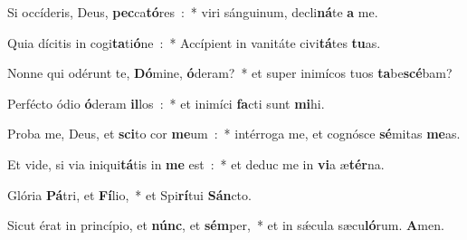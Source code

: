 \item Si occíderis, Deus, \textbf{pec}\-ca\textbf{tó}\-res~:~* viri sánguinum, decli\textbf{ná}\-te \textbf{a} me.
\item Quia dícitis in cogi\textbf{ta}\-ti\textbf{ó}\-ne~:~* Accípient in vanitáte civi\textbf{tá}\-tes \textbf{tu}as.
\item Nonne qui odérunt te, \textbf{Dó}\-mine, \textbf{ó}\-deram?~* et super inimícos tuos \textbf{ta}be\textbf{scé}bam?
\item Perfécto ódio \textbf{ó}\-deram \textbf{il}\-los~:~* et inimíci \textbf{fa}\-cti sunt \textbf{mi}hi.
\item Proba me, Deus, et \textbf{sci}\-to cor \textbf{me}\-um~:~* intérroga me, et cognósce \textbf{sé}\-mitas \textbf{me}as.
\item Et vide, si via iniqui\textbf{tá}\-tis in \textbf{me} est~:~* et deduc me in \textbf{vi}\-a æ\textbf{tér}na.
\item Glória \textbf{Pá}\-tri, et \textbf{Fí}\-lio,~* et Spi\textbf{rí}\-tui \textbf{Sán}cto.
\item Sicut érat in princípio, et \textbf{núnc}, et \textbf{sém}\-per,~* et in sǽcula sæcu\textbf{ló}\-rum. \textbf{A}men.